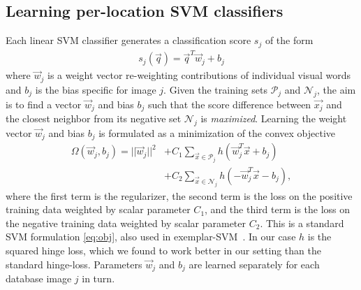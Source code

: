    \subsection{Learning per-location SVM classifiers }
      Each linear SVM classifier %
      {generates} 
      a \textcolor{petr}{classification} score 
      $s_j$ of the form 
      \begin{align}
        s_j(\vec{q})=\vec{q}^T \vec{w}_j+b_j
        \label{eq:linear}
      \end{align}
      \noindent
      where $\vec{w}_j$ is a weight vector re-weighting contributions of individual visual words and $b_j$ is the bias specific for image $j$. Given the training sets $\mathcal P_j$ and $\mathcal N_j$, the aim is to find a vector $\vec{w}_j$ and bias $b_j$ such that the score difference between $\vec{x_j}$ and the closest neighbor from its negative set $\mathcal N_j$ is {\em maximized}.
      Learning the weight vector $\vec{w}_j$ and bias $b_j$ is formulated as a minimization of the convex objective 
      \begin{align}
        \nonumber
        \Omega(\vec{w}_j,b_j)=||\vec{w}_j||^{2}& +C_1\sum_{\vec{x}\in \mathcal P_j}h(\vec{w}_j^T\vec{x}+b_j)   \\
        \label{eq:obj}
                           & +C_2\sum_{\vec{x}\in \mathcal N_j}h(-\vec{w}_j^T\vec{x}-b_j), 
      \end{align}
      \noindent
      where the first term is the regularizer, the second term is the loss on the positive training data weighted by scalar parameter $C_1$, and the third term is the loss on the negative training data weighted by scalar parameter $C_2$.   
      This is a standard SVM formulation \eqref{eq:obj}, also used in exemplar-SVM~\cite{Malisiewicz11}.
      In our case $h$ is the squared hinge loss, which we found to work better in our setting than the standard hinge-loss. Parameters $\vec{w}_j$ and $b_j$ are learned separately for each database image $j$ in turn. 
     
